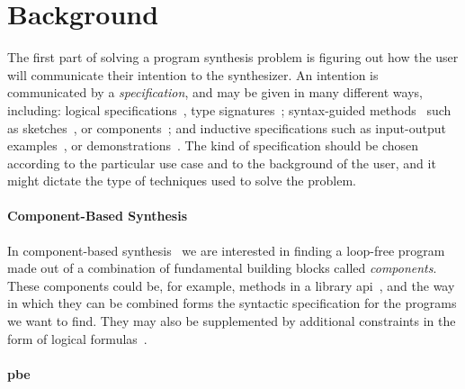 \section{Background}
\label{sec:background}

The first part of solving a program synthesis problem is figuring out how the
user will communicate their intention to the synthesizer. An intention is
communicated by a \textit{specification}, and may be given in many different
ways, including:
logical specifications~\cite{Itzhaky:SIS:2010},
type signatures~\cite{Osera:2015:TPS,
  Frankle:2016:EST, Polikarpova:2016:PSP};
syntax-guided methods~\cite{Alur:sygus:2013} such as
sketches~\cite{Solar-Lezama:2008}, or components~\cite{Feng:2017:CST,
Feng:2017:CSC, Feng:2018:PSU}; and
inductive specifications such as input-output examples~\cite{Frankle:2016:EST,
Gulwani:2012:SDM, Leung:2015:IPS}, or demonstrations~\cite{Lau2003}.
The kind of specification should be chosen according to the particular use case
and to the background of the user, and it might dictate the type of techniques
used to solve the problem.

\paragraph{Component-Based Synthesis}
\label{sec:components}

In component-based
synthesis~\cite{Feng:2018:PSU,Feng:2017:CST,Feng:2017:CSC,Jha:oracle:2010}
we are interested in finding a loop-free program made out of a combination of
fundamental building blocks called \textit{components}. These components could
be, for example, methods in a library
\gls{api}~\cite{Feng:2017:CSC}, and the way in which they can be
combined forms the syntactic specification for the programs we want to find.
They may also be supplemented by additional constraints in the form of logical
formulas~\cite{Feng:2018:PSU}.

\paragraph{\gls{pbe}}

